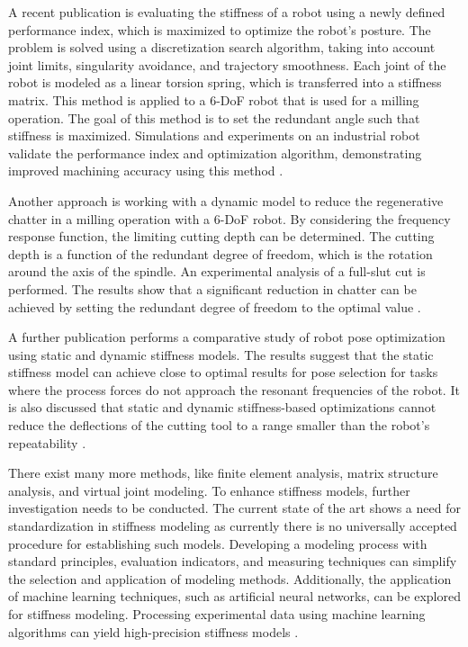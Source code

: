 A recent publication is evaluating the stiffness of a robot using a newly defined performance index, which is maximized to optimize the robot's posture. The problem is solved using a discretization search algorithm, taking into account joint limits, singularity avoidance, and trajectory smoothness. 
Each joint of the robot is modeled as a linear torsion spring, which is transferred into a stiffness matrix. This method is applied to a 6-DoF robot that is used for a milling operation. The goal of this method is to set the redundant angle such that stiffness is maximized. Simulations and experiments on an industrial robot validate the performance index and optimization algorithm, demonstrating improved machining accuracy using this method \cite{Xiong.2019}.


Another approach is working with a dynamic model to reduce the regenerative chatter in a milling operation with a 6-DoF robot. By considering the frequency response function, the limiting cutting depth can be determined. The cutting depth is a function of the redundant degree of freedom, which is the rotation around the axis of the spindle. An experimental analysis of a full-slut cut is performed. The results show that a significant reduction in chatter can be achieved by setting the redundant degree of freedom to the optimal value \cite{Wang.2022}.

A further publication performs a comparative study of robot pose optimization using static and dynamic stiffness models. The results suggest that the static stiffness model can achieve close to optimal results for pose selection for tasks where the process forces do not approach the resonant frequencies of the robot. It is also discussed that static and dynamic stiffness-based optimizations cannot reduce the deflections of the cutting tool to a range smaller than the robot's repeatability \cite{Cvitanic.2020}.

There exist many more methods, like finite element analysis, matrix structure analysis, and virtual joint modeling. 
To enhance stiffness models, further investigation needs to be conducted. The current state of the art shows a need for standardization in stiffness modeling as currently there is no universally accepted procedure for establishing such models. Developing a modeling process with standard principles, evaluation indicators, and measuring techniques can simplify the selection and application of modeling methods. Additionally, the application of machine learning techniques, such as artificial neural networks, can be explored for stiffness modeling. Processing experimental data using machine learning algorithms can yield high-precision stiffness models \cite{Wu.2022}.

